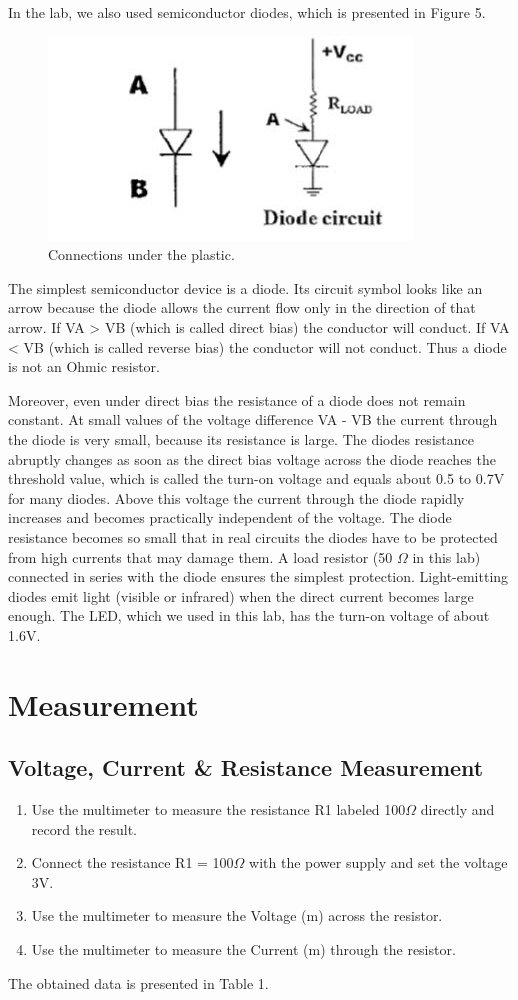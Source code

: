 \documentclass[a4paper]{report}
\begin{document}
	In the lab, we also used semiconductor diodes, which is presented in Figure 5.
	\begin{figure}[H]
		\centering
		\includegraphics[width=0.8\linewidth]{5.jpg}
		\caption{Connections under the plastic.}
	\end{figure}
	The simplest semiconductor device is a diode. Its circuit symbol looks like an arrow because the diode allows the current flow only in the direction of that arrow. If VA > VB (which is called direct bias) the conductor will conduct. If VA < VB (which is called reverse bias) the conductor will not conduct. Thus a diode is not an Ohmic resistor.
	
	Moreover, even under direct bias the resistance of a diode does not remain constant. At small values of the voltage difference VA - VB the current through the diode is very small, because its resistance is large. The diodes resistance abruptly changes as soon as the direct bias voltage across the diode reaches the threshold value, which is called the turn-on voltage and equals about 0.5 to 0.7V for many diodes. Above this voltage the current through the diode rapidly increases and becomes practically independent of the voltage. The diode resistance becomes so small that in real circuits the diodes have to be protected from high currents that may damage them. A load resistor (50 $\Omega$ in this lab) connected in series with the diode ensures the simplest protection. Light-emitting diodes emit light (visible or infrared) when the direct current becomes large enough. The LED, which we used in this lab, has the turn-on voltage of about 1.6V.
	\section{Measurement}
	\subsection{Voltage, Current \& Resistance Measurement}
	\begin{enumerate}[1.]
		\item Use the multimeter to measure the resistance R1 labeled 100$\Omega$ directly and record the result.
		\item Connect the resistance R1 = 100$\Omega$ with the power supply and set the voltage 3V.
		\item Use the multimeter to measure the Voltage (m) across the resistor.
		\item Use the multimeter to measure the Current (m) through the resistor.
	\end{enumerate}
	The obtained data is presented in Table 1.
\end{document}
